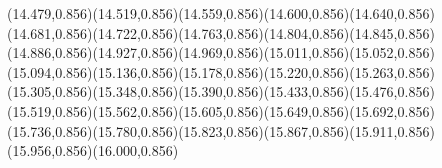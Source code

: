 \documentclass[smallextended]{svjour3}
\begin{document}
(14.479,0.856)(14.519,0.856)(14.559,0.856)(14.600,0.856)(14.640,0.856)(14.681,0.856)(14.722,0.856)(14.763,0.856)(14.804,0.856)(14.845,0.856)(14.886,0.856)(14.927,0.856)(14.969,0.856)(15.011,0.856)(15.052,0.856)(15.094,0.856)(15.136,0.856)(15.178,0.856)(15.220,0.856)(15.263,0.856)(15.305,0.856)(15.348,0.856)(15.390,0.856)(15.433,0.856)(15.476,0.856)(15.519,0.856)(15.562,0.856)(15.605,0.856)(15.649,0.856)(15.692,0.856)(15.736,0.856)(15.780,0.856)(15.823,0.856)(15.867,0.856)(15.911,0.856)(15.956,0.856)(16.000,0.856)

\end{document}
